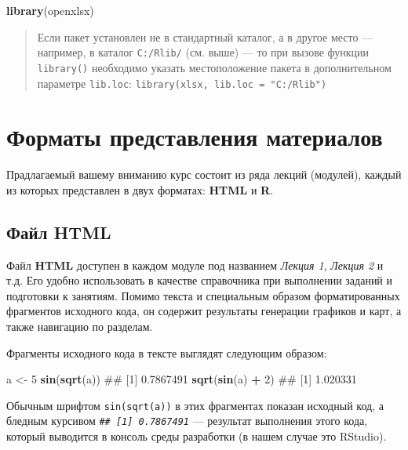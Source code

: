 \documentclass[]{book}
\newenvironment{Shaded}{\begin{snugshade}}{\end{snugshade}}
\newcommand{\KeywordTok}[1]{\textcolor[rgb]{0.13,0.29,0.53}{\textbf{#1}}}
\newcommand{\DecValTok}[1]{\textcolor[rgb]{0.00,0.00,0.81}{#1}}
\newcommand{\StringTok}[1]{\textcolor[rgb]{0.31,0.60,0.02}{#1}}
\newcommand{\OperatorTok}[1]{\textcolor[rgb]{0.81,0.36,0.00}{\textbf{#1}}}
\newcommand{\NormalTok}[1]{#1}
\begin{document}
\begin{Shaded}
\begin{Highlighting}[]
\KeywordTok{library}\NormalTok{(openxlsx)}
\end{Highlighting}
\end{Shaded}

\begin{quote}
Если пакет установлен не в стандартный каталог, а в другое место ---
например, в каталог \texttt{С:/Rlib/} (см. выше) --- то при вызове
функции \texttt{library()} необходимо указать местоположение пакета в
дополнительном параметре \texttt{lib.loc}:
\texttt{library(xlsx,\ lib.loc\ =\ "C:/Rlib")}
\end{quote}

\section*{Форматы представления материалов}\label{--}

Прадлагаемый вашему вниманию курс состоит из ряда лекций (модулей),
каждый из которых представлен в двух форматах: \textbf{HTML} и
\textbf{R}.

\subsection*{Файл HTML}\label{-html}

Файл \textbf{HTML} доступен в каждом модуле под названием \emph{Лекция
1}, \emph{Лекция 2} и т.д. Его удобно использовать в качестве
справочника при выполнении заданий и подготовки к занятиям. Помимо
текста и специальным образом форматированных фрагментов исходного кода,
он содержит результаты генерации графиков и карт, а также навигацию по
разделам.

Фрагменты исходного кода в тексте выглядят следующим образом:

\begin{Shaded}
\begin{Highlighting}[]
\NormalTok{a <-}\StringTok{ }\DecValTok{5}
\KeywordTok{sin}\NormalTok{(}\KeywordTok{sqrt}\NormalTok{(a))}
\NormalTok{## [1] 0.7867491}
\KeywordTok{sqrt}\NormalTok{(}\KeywordTok{sin}\NormalTok{(a) }\OperatorTok{+}\StringTok{ }\DecValTok{2}\NormalTok{)}
\NormalTok{## [1] 1.020331}
\end{Highlighting}
\end{Shaded}

Обычным шрифтом \texttt{sin(sqrt(a))} в этих фрагментах показан исходный
код, а бледным курсивом \emph{\texttt{\#\#\ {[}1{]}\ 0.7867491}} ---
результат выполнения этого кода, который выводится в консоль среды
разработки (в нашем случае это RStudio).
\end{document}
